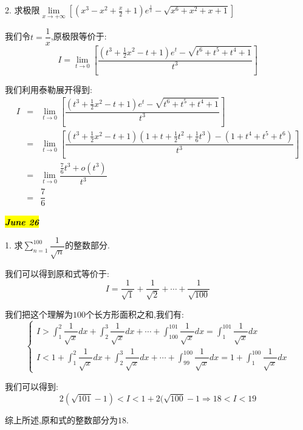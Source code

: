 2. 求极限$\lim\limits_{x\rightarrow +\infty}\left[(x^3-x^2+\frac{x}{2}+1)e^{\frac{1}{x}}-\sqrt{x^6+x^2+x+1} \right] $
\begin{solution}
	
	我们令$t=\dfrac{1}{x}$,原极限等价于: 
	$$I=\lim\limits_{t\rightarrow 0}\left[ \dfrac{(t^3+\frac{1}{2}x^2-t+1)e^t-\sqrt{t^6+t^5+t^4+1}}{t^3}\right] $$
	
	我们利用泰勒展开得到: 
	\begin{eqnarray*}
		I&=&\lim\limits_{t\rightarrow 0}\left[ \dfrac{(t^3+\frac{1}{2}x^2-t+1)e^t-\sqrt{t^6+t^5+t^4+1}}{t^3}\right]\\
		&=&\lim\limits_{t\rightarrow 0}\left[ \dfrac{(t^3+\frac{1}{2}x^2-t+1)(1+t+\frac{1}{2}t^2+\frac{1}{6}t^3)-(1+t^4+t^5+t^6)}{t^3}\right]\\
		&=&\lim\limits_{t\rightarrow 0}\dfrac{\frac{7}{6}t^3+o(t^3)}{t^3}\\
		&=&\dfrac{7}{6}
	\end{eqnarray*}
\end{solution}

\hl{\textbf{\textit{June 26}}}

1. 求$\sum\limits_{n=1}^{100}\dfrac{1}{\sqrt{n}}$的整数部分.
\begin{solution}
	
	我们可以得到原和式等价于: 
	$$I=\dfrac{1}{\sqrt{1}}+\dfrac{1}{\sqrt{2}}+\cdots+\dfrac{1}{\sqrt{100}}$$
	
	我们把这个理解为$100$个长方形面积之和,我们有: 
	$$\left\lbrace
	\begin{array}{l}
		I>\int_{1}^{2}\dfrac{1}{\sqrt{x}}dx+\int_{2}^{3}\dfrac{1}{\sqrt{x}}dx+\cdots+\int_{100}^{101}\dfrac{1}{\sqrt{x}}dx=\int_{1}^{101}\dfrac{1}{\sqrt{x}}dx\\
		I<1+\int_{1}^{2}\dfrac{1}{\sqrt{x}}dx+\int_{2}^{3}\dfrac{1}{\sqrt{x}}dx+\cdots+\int_{99}^{100}\dfrac{1}{\sqrt{x}}dx=1+\int_{1}^{100}\dfrac{1}{\sqrt{x}}dx
	\end{array}
	\right. $$
	
	我们可以得到: 
	$$2(\sqrt{101}-1)<I<1+2(\sqrt{100}-1\Rightarrow 18<I<19$$
	
	综上所述,原和式的整数部分为$18$.
\end{solution}

